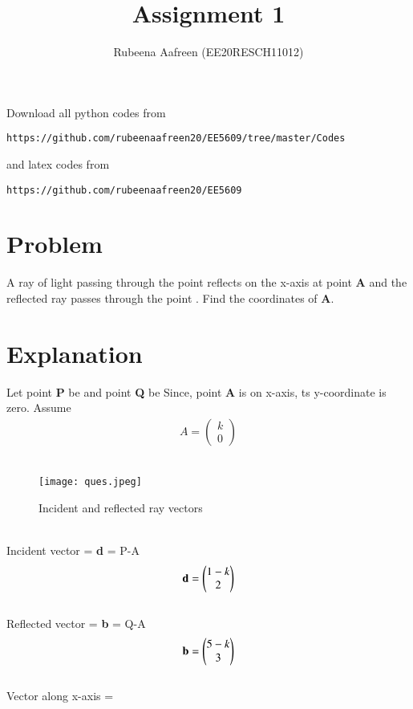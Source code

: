 \documentclass[journal,12pt,twocolumn]{IEEEtran}
\begin{document}
     \def\rightbox#1{\makebox[0in][r]{#1}}
     \def\centbox#1{\makebox[0in]{#1}}
     \def\topbox#1{\raisebox{-\baselineskip}[0in][0in]{#1}}
     \def\midbox#1{\raisebox{-0.5\baselineskip}[0in][0in]{#1}}
\vspace{3cm}
\title{Assignment 1}
\author{Rubeena Aafreen (EE20RESCH11012)}
\maketitle
\newpage
\bigskip
\renewcommand{\thefigure}{\theenumi}
\renewcommand{\thetable}{\theenumi}
Download all python codes from 
\begin{lstlisting}
https://github.com/rubeenaafreen20/EE5609/tree/master/Codes
\end{lstlisting}
%
and latex codes from 
%
\begin{lstlisting}
https://github.com/rubeenaafreen20/EE5609
\end{lstlisting}
%
\section{Problem}
A ray of light passing through the point 
reflects on the x-axis at point \textbf{A} and the reflected ray passes through the point . Find
the coordinates of \textbf{A}.
\section{Explanation}
Let point \textbf{P} be  and point \textbf{Q} be 
Since, point \textbf{A} is on x-axis, ts y-coordinate is zero.
Assume \begin{align}
    A=\begin{pmatrix} k \\ 0 \end{pmatrix}
\end{align} \\
\begin{figure}[h]
\centering
\texttt{[image: ques.jpeg]}
\caption{Incident and reflected ray vectors}
\label{fig:}
\end{figure}
\\
Incident vector = \textbf{d} = P-A
\begin{align}
    \textbf{d}=\begin{pmatrix}1-k \\ 2\end{pmatrix}
\end{align}
\\
Reflected vector = \textbf{b} = Q-A
\begin{align}
    \textbf{b}=\begin{pmatrix}5-k \\ 3\end{pmatrix}
\end{align}
\\
Vector along x-axis = 
\end{document}
